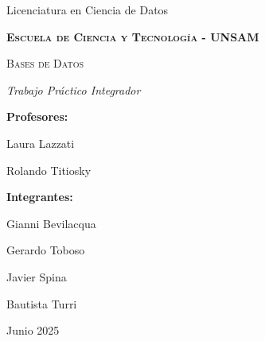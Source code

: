\documentclass[11pt]{article}
\begin{document}
\begin{titlepage}
{
    \centering
    {\Large Licenciatura en Ciencia de Datos \par}
    {\bfseries\scshape\Large Escuela de Ciencia y Tecnología - UNSAM \par}
    \vspace{3cm}
    {\scshape\Huge Bases de Datos \par}
    {\itshape\Large Trabajo Práctico Integrador \par}
    \vfill
}
{\bfseries{\Large Profesores:}}

{\Large Laura Lazzati}

{\Large Rolando Titiosky}
\vspace{1cm}

{\bfseries{\Large Integrantes:}}

{\Large Gianni Bevilacqua}

{\Large Gerardo Toboso}

{\Large Javier Spina}

{\Large Bautista Turri}
\vfill
{\Large Junio 2025 \par}
\end{titlepage}

\lipsum[1-5]
\end{document}
